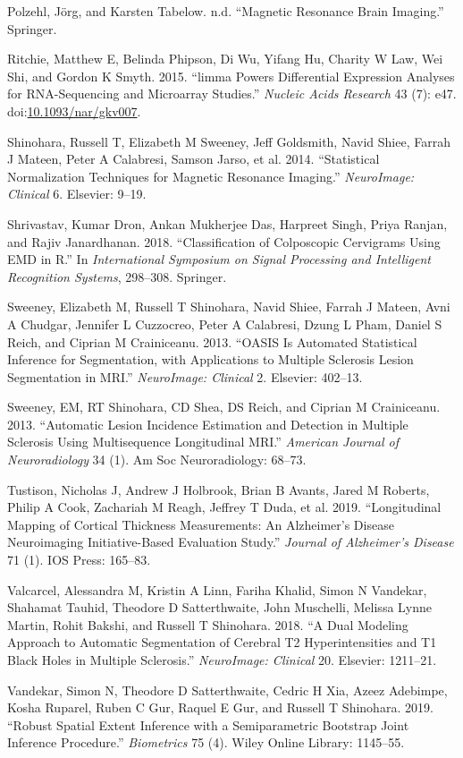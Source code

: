 \documentclass[]{elsarticle} %
\begin{document}
\hypertarget{ref-polzehlmagnetic}{}
Polzehl, Jörg, and Karsten Tabelow. n.d. ``Magnetic Resonance Brain
Imaging.'' Springer.

\hypertarget{ref-limma}{}
Ritchie, Matthew E, Belinda Phipson, Di Wu, Yifang Hu, Charity W Law,
Wei Shi, and Gordon K Smyth. 2015. ``limma Powers Differential
Expression Analyses for RNA-Sequencing and Microarray Studies.''
\emph{Nucleic Acids Research} 43 (7): e47.
doi:\href{https://doi.org/10.1093/nar/gkv007}{10.1093/nar/gkv007}.

\hypertarget{ref-shinohara2014statistical}{}
Shinohara, Russell T, Elizabeth M Sweeney, Jeff Goldsmith, Navid Shiee,
Farrah J Mateen, Peter A Calabresi, Samson Jarso, et al. 2014.
``Statistical Normalization Techniques for Magnetic Resonance Imaging.''
\emph{NeuroImage: Clinical} 6. Elsevier: 9--19.

\hypertarget{ref-shrivastav2018classification}{}
Shrivastav, Kumar Dron, Ankan Mukherjee Das, Harpreet Singh, Priya
Ranjan, and Rajiv Janardhanan. 2018. ``Classification of Colposcopic
Cervigrams Using EMD in R.'' In \emph{International Symposium on Signal
Processing and Intelligent Recognition Systems}, 298--308. Springer.

\hypertarget{ref-sweeney2013oasis}{}
Sweeney, Elizabeth M, Russell T Shinohara, Navid Shiee, Farrah J Mateen,
Avni A Chudgar, Jennifer L Cuzzocreo, Peter A Calabresi, Dzung L Pham,
Daniel S Reich, and Ciprian M Crainiceanu. 2013. ``OASIS Is Automated
Statistical Inference for Segmentation, with Applications to Multiple
Sclerosis Lesion Segmentation in MRI.'' \emph{NeuroImage: Clinical} 2.
Elsevier: 402--13.

\hypertarget{ref-sweeney2013automatic}{}
Sweeney, EM, RT Shinohara, CD Shea, DS Reich, and Ciprian M Crainiceanu.
2013. ``Automatic Lesion Incidence Estimation and Detection in Multiple
Sclerosis Using Multisequence Longitudinal MRI.'' \emph{American Journal
of Neuroradiology} 34 (1). Am Soc Neuroradiology: 68--73.

\hypertarget{ref-tustison2019longitudinal}{}
Tustison, Nicholas J, Andrew J Holbrook, Brian B Avants, Jared M
Roberts, Philip A Cook, Zachariah M Reagh, Jeffrey T Duda, et al. 2019.
``Longitudinal Mapping of Cortical Thickness Measurements: An
Alzheimer's Disease Neuroimaging Initiative-Based Evaluation Study.''
\emph{Journal of Alzheimer's Disease} 71 (1). IOS Press: 165--83.

\hypertarget{ref-valcarcel2018dual}{}
Valcarcel, Alessandra M, Kristin A Linn, Fariha Khalid, Simon N
Vandekar, Shahamat Tauhid, Theodore D Satterthwaite, John Muschelli,
Melissa Lynne Martin, Rohit Bakshi, and Russell T Shinohara. 2018. ``A
Dual Modeling Approach to Automatic Segmentation of Cerebral T2
Hyperintensities and T1 Black Holes in Multiple Sclerosis.''
\emph{NeuroImage: Clinical} 20. Elsevier: 1211--21.

\hypertarget{ref-vandekar2019robust}{}
Vandekar, Simon N, Theodore D Satterthwaite, Cedric H Xia, Azeez
Adebimpe, Kosha Ruparel, Ruben C Gur, Raquel E Gur, and Russell T
Shinohara. 2019. ``Robust Spatial Extent Inference with a Semiparametric
Bootstrap Joint Inference Procedure.'' \emph{Biometrics} 75 (4). Wiley
Online Library: 1145--55.
\end{document}
